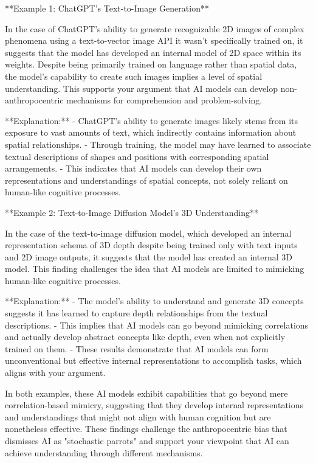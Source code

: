 \documentclass{article}
\begin{document}
**Example 1: ChatGPT's Text-to-Image Generation**

In the case of ChatGPT's ability to generate recognizable 2D images of complex phenomena using a text-to-vector image API it wasn't specifically trained on, it suggests that the model has developed an internal model of 2D space within its weights. Despite being primarily trained on language rather than spatial data, the model's capability to create such images implies a level of spatial understanding. This supports your argument that AI models can develop non-anthropocentric mechanisms for comprehension and problem-solving.

**Explanation:**
- ChatGPT's ability to generate images likely stems from its exposure to vast amounts of text, which indirectly contains information about spatial relationships.
- Through training, the model may have learned to associate textual descriptions of shapes and positions with corresponding spatial arrangements.
- This indicates that AI models can develop their own representations and understandings of spatial concepts, not solely reliant on human-like cognitive processes.

**Example 2: Text-to-Image Diffusion Model's 3D Understanding**

In the case of the text-to-image diffusion model, which developed an internal representation schema of 3D depth despite being trained only with text inputs and 2D image outputs, it suggests that the model has created an internal 3D model. This finding challenges the idea that AI models are limited to mimicking human-like cognitive processes.

**Explanation:**
- The model's ability to understand and generate 3D concepts suggests it has learned to capture depth relationships from the textual descriptions.
- This implies that AI models can go beyond mimicking correlations and actually develop abstract concepts like depth, even when not explicitly trained on them.
- These results demonstrate that AI models can form unconventional but effective internal representations to accomplish tasks, which aligns with your argument.

In both examples, these AI models exhibit capabilities that go beyond mere correlation-based mimicry, suggesting that they develop internal representations and understandings that might not align with human cognition but are nonetheless effective. These findings challenge the anthropocentric bias that dismisses AI as "stochastic parrots" and support your viewpoint that AI can achieve understanding through different mechanisms.
\end{document}
